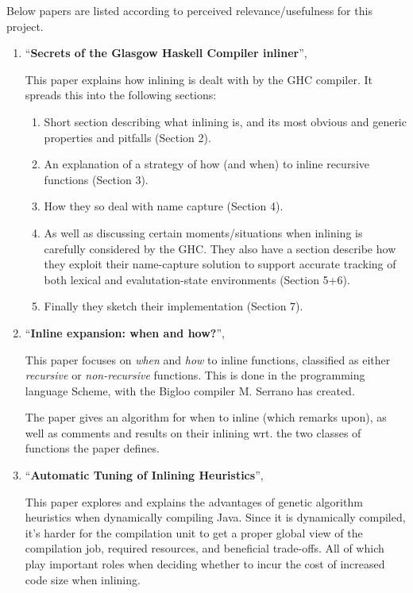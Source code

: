 Below papers are listed according to perceived relevance/usefulness for this
project.\\

\begin{enumerate}
	\item ``\textbf{Secrets of the Glasgow Haskell Compiler inliner}'',
\cite{GHC-paper}

This paper explains how inlining is dealt with by the GHC compiler. It spreads
this into the following sections:
\begin{enumerate}
	\item Short section describing what inlining is, and its most obvious and
generic properties and pitfalls (Section 2).
	\item An explanation of a strategy of how (and when) to inline recursive
functions (Section 3).
	\item How they so deal with name capture (Section 4).
	\item As well as discussing certain moments/situations when inlining is
carefully considered by the GHC. They also have a section describe how they
exploit their name-capture solution to support accurate tracking of both lexical
and evalutation-state environments (Section 5+6).
	\item Finally they sketch their implementation (Section 7).
\end{enumerate}

	\item ``\textbf{Inline expansion: when and how?}'',
\cite{InlineWhenHowSerrano}

This paper focuses on \textit{when} and \textit{how} to inline functions,
classified as either \textit{recursive} or \textit{non-recursive} functions.
This is done in the programming language Scheme, with the
Bigloo compiler M. Serrano has created.

The paper gives an algorithm for when to inline (which \cite{GHC-paper} remarks
upon), as well as comments and results on their inlining wrt. the two classes of
functions the paper defines.

	\item ``\textbf{Automatic Tuning of Inlining Heuristics}'',
\cite{AutoTuningJavaHeuristics}

This paper explores and explains the advantages of genetic algorithm  heuristics
when dynamically compiling Java. Since it is dynamically compiled, it's harder
for the compilation unit to get a proper global view of the compilation job,
required resources, and beneficial trade-offs. All of which play important roles
when deciding whether to incur the cost of increased code size when inlining.


\end{enumerate}
